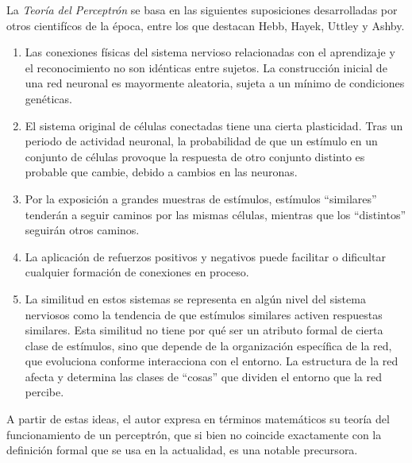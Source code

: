 \documentclass[11pt,twoside,titlepage,a4paper]{article}
\numberwithin{equation}{section} %
\theoremstyle{usual}
\begin{document}
    La \textit{Teoría del Perceptrón} se basa en las siguientes suposiciones desarrolladas por otros cientifícos de la época, entre los que destacan Hebb, Hayek, Uttley y Ashby.
    \begin{enumerate}
        \item Las conexiones físicas del sistema nervioso relacionadas
        con el aprendizaje y el reconocimiento no son idénticas entre 
        sujetos. La construcción inicial de una red neuronal es 
        mayormente aleatoria, sujeta a un mínimo de condiciones 
        genéticas.
        \item El sistema original de células conectadas tiene una
        cierta plasticidad. Tras un periodo de actividad neuronal,
        la probabilidad de que un estímulo en un conjunto de células
        provoque la respuesta de otro conjunto distinto es probable
        que cambie, debido a cambios en las neuronas.
        \item Por la exposición a grandes muestras de estímulos,
        estímulos ``similares'' tenderán a seguir caminos por las 
        mismas células, mientras que los ``distintos'' seguirán otros 
        caminos.
        \item La aplicación de refuerzos positivos y negativos puede
        facilitar o dificultar cualquier formación de conexiones
        en proceso.
        \item La similitud en estos sistemas se representa en algún 
        nivel del sistema nerviosos como la tendencia de que estímulos
        similares activen respuestas similares. Esta similitud no tiene
        por qué ser un atributo formal de cierta clase de estímulos,
        sino que depende de la organización específica de la red, que
        evoluciona conforme interacciona con el entorno. La estructura
        de la red afecta y determina las clases de ``cosas'' que 
        dividen el entorno que la red percibe.
    \end{enumerate}
    
    A partir de estas ideas, el autor expresa en términos matemáticos su teoría del funcionamiento de un perceptrón, que si bien no coincide exactamente con la definición formal que se usa en la actualidad, es una notable precursora.
    
        
\end{document}
